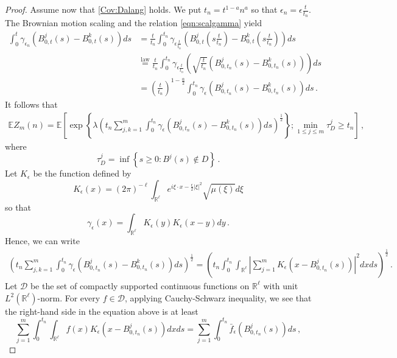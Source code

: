 \documentclass[12pt,reqno]{amsart}
\theoremstyle{remark}
\newcommand{\1}{\mathbf{1}}
\def\RR{\mathbb{R}}
\def\EE{\mathbb{E}}
\def\lt{\left}
\def\rt{\right}
\begin{document}
\begin{proof}
		Assume now that \ref{Cov:Dalang} holds.
		We put $t_n=t^{1-a}n^a$	so that $\epsilon_n=\epsilon\frac t{t_n}$.
		The Brownian motion scaling and the relation \eqref{eqn:scalgamma} yield 
		\begin{align*}
			\int_0^t \gamma_{\epsilon_n}(B^j_{0,t}(s)-B^k_{0,t}(s))ds
			&=\frac{t}{t_n} \int_0^{t_n} \gamma_{\epsilon\frac{t}{t_n}}\lt(B^j_{0,t}(s\frac{t}{t_n})-B^k_{0,t}(s\frac{t}{t_n})\rt)ds
			\\&\overset{\mathrm{law}}{=}\frac{t}{t_n}\int_0^{t_n} \gamma_{\epsilon\frac{t}{t_n}}\lt(\sqrt{\frac{t}{t_n}}(B^j_{0,t_n}(s)-B^k_{0,t_n}(s))\rt)ds
			\\&=\lt(\frac t{t_n} \rt)^{1- \frac\alpha2}\int_0^{t_n}\gamma_ \epsilon(B^j_{0,t_n}(s)-B^k_{0,t_n}(s))ds\,.
		\end{align*}
		It follows that
		\begin{align*}
			\EE Z_m(n)=\EE\lt[\exp\lt\{\lambda\lt(t_n \sum_{j,k=1}^m\int_0^{t_n}\gamma_ \epsilon(B^j_{0,t_n}(s)-B^k_{0,t_n}(s))ds \rt)^{\frac12} \rt\};\min_{1\le j\le m}\tau^j_D\ge t_n\rt]\,,
		\end{align*}
		where 
		\begin{equation*}
		  	\tau_D^j=\inf\lt\{s\ge 0:B^j(s)\not\in  D \rt\}\,.
		\end{equation*}
		Let $K_ \epsilon$ be the function defined by 
		\begin{equation*}
			K_ \epsilon(x)=(2 \pi)^{-\ell}\int_{\RR^\ell}e^{i \xi\cdot x-\frac \epsilon2|\xi|^2}\sqrt{\mu(\xi)}d \xi
		\end{equation*}
		so that
		\begin{equation}\label{eqn:gKK}
			\gamma_ \epsilon(x)=\int_{\RR^\ell}K_ \epsilon (y)K_ \epsilon(x-y)dy\,.
		\end{equation}
		Hence, we can write
		\begin{align*}
			\lt(t_n\sum_{j,k=1}^m\int_0^{t_n}\gamma_ \epsilon(B^j_{0,t_n}(s)-B^k_{0,t_n}(s))ds \rt)^{\frac12}
			=\lt( t_n\int_0^{t_n}\int_{\RR^\ell}\lt|\sum_{j=1}^m K_ \epsilon(x-B^j_{0,t_n}(s)) \rt|^2 dxds \rt)^{\frac12}\,.
		\end{align*}
		Let $\mathcal D$ be the set of compactly supported continuous functions on $\RR^\ell$ with unit $L^2(\RR^{\ell})$-norm. For every $f\in \mathcal D$, applying Cauchy-Schwarz inequality, we see that the right-hand side in the equation above is at least
		\begin{equation*}
			\sum_{j=1}^m\int_0^{t_n}\int_{\RR^\ell}f(x) K_ \epsilon\lt(x-B^j_{0,t_n}(s)\rt)dxds=\sum_{j=1}^m\int_0^{t_n}\bar f_ \epsilon\lt(B^j_{0,t_n}(s)\rt)ds\,,

\end{equation*}
\end{proof}
\end{document}

